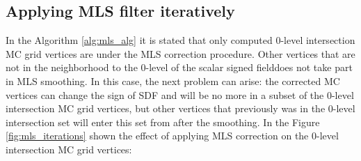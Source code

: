 \subsection{Applying MLS filter iteratively}
In the Algorithm \ref{alg:mls_alg} it is stated that only computed 0-level intersection MC grid vertices are under the MLS correction procedure. Other vertices that are not in the neighborhood to the 0-level of the scalar signed fielddoes not take part in MLS smoothing. In this case, the next problem can arise: the corrected MC vertices can change the sign of SDF and will be no more in a subset of the 0-level intersection MC grid vertices, but other vertices that previously was in the 0-level intersection set will enter this set from after the smoothing. In the Figure \ref{fig:mls_iterations} shown the effect of applying MLS correction on the 0-level intersection MC grid vertices:

